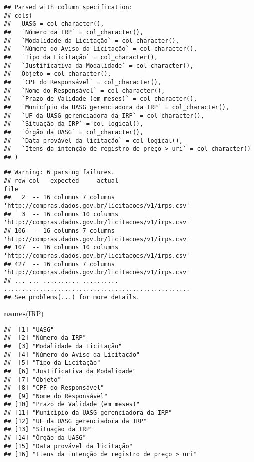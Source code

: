 \documentclass[]{article}
\newenvironment{Shaded}{\begin{snugshade}}{\end{snugshade}}
\newcommand{\KeywordTok}[1]{\textcolor[rgb]{0.13,0.29,0.53}{\textbf{#1}}}
\newcommand{\NormalTok}[1]{#1}
\begin{document}
\begin{verbatim}
## Parsed with column specification:
## cols(
##   UASG = col_character(),
##   `Número da IRP` = col_character(),
##   `Modalidade da Licitação` = col_character(),
##   `Número do Aviso da Licitação` = col_character(),
##   `Tipo da Licitação` = col_character(),
##   `Justificativa da Modalidade` = col_character(),
##   Objeto = col_character(),
##   `CPF do Responsável` = col_character(),
##   `Nome do Responsável` = col_character(),
##   `Prazo de Validade (em meses)` = col_character(),
##   `Município da UASG gerenciadora da IRP` = col_character(),
##   `UF da UASG gerenciadora da IRP` = col_character(),
##   `Situação da IRP` = col_logical(),
##   `Órgão da UASG` = col_character(),
##   `Data provável da licitação` = col_logical(),
##   `Itens da intenção de registro de preço > uri` = col_character()
## )
\end{verbatim}

\begin{verbatim}
## Warning: 6 parsing failures.
## row col   expected     actual                                                 file
##   2  -- 16 columns 7 columns  'http://compras.dados.gov.br/licitacoes/v1/irps.csv'
##   3  -- 16 columns 10 columns 'http://compras.dados.gov.br/licitacoes/v1/irps.csv'
## 106  -- 16 columns 7 columns  'http://compras.dados.gov.br/licitacoes/v1/irps.csv'
## 107  -- 16 columns 10 columns 'http://compras.dados.gov.br/licitacoes/v1/irps.csv'
## 427  -- 16 columns 7 columns  'http://compras.dados.gov.br/licitacoes/v1/irps.csv'
## ... ... .......... .......... ....................................................
## See problems(...) for more details.
\end{verbatim}

\begin{Shaded}
\begin{Highlighting}[]
\KeywordTok{names}\NormalTok{(IRP)}
\end{Highlighting}
\end{Shaded}

\begin{verbatim}
##  [1] "UASG"                                        
##  [2] "Número da IRP"                               
##  [3] "Modalidade da Licitação"                     
##  [4] "Número do Aviso da Licitação"                
##  [5] "Tipo da Licitação"                           
##  [6] "Justificativa da Modalidade"                 
##  [7] "Objeto"                                      
##  [8] "CPF do Responsável"                          
##  [9] "Nome do Responsável"                         
## [10] "Prazo de Validade (em meses)"                
## [11] "Município da UASG gerenciadora da IRP"       
## [12] "UF da UASG gerenciadora da IRP"              
## [13] "Situação da IRP"                             
## [14] "Órgão da UASG"                               
## [15] "Data provável da licitação"                  
## [16] "Itens da intenção de registro de preço > uri"
\end{verbatim}
\end{document}
